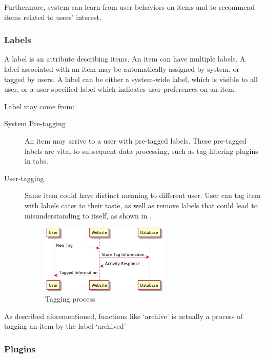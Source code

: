 Furthermore, system can learn from user behaviors on items and to
recommend items related to users' interest.

\subsubsection{Labels}

A label is an attribute describing items. An item can have multiple
labels. A label associated with an item may be automatically assigned by
system, or tagged by users. A label can be either a system-wide label,
which is visible to all user, or a user specified label which indicates
user preferences on an item.

Label may come from:

\begin{description}
\item[System Pre-tagging]
  An item may arrive to a user with pre-tagged
  labels. These pre-tagged labels are vital to subsequent data
  processing, such as tag-filtering plugins in tabs.

\item[User-tagging]
  Same item could have distinct meaning to different user.
  User can tag item with labels cater to their taste, as well as remove
  labels that could lead to misunderstanding to itself, as shown in .

\begin{figure}[H]
  \centering
  \includegraphics[width=0.6\textwidth]{img/tagging.png}
  \caption{Tagging process\label{fig:tagging}}
\end{figure}

\end{description}

As described aforementioned, functions like `archive' is actually a process of tagging an
item by the label `archived'

\subsubsection{Plugins}


